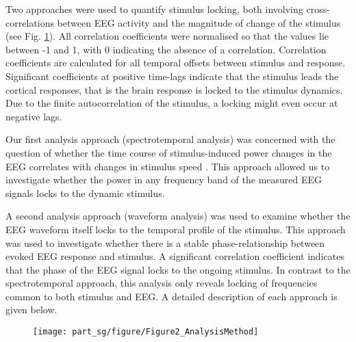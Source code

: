 Two approaches were used to quantify stimulus locking, both involving
cross-correlations between EEG activity and the magnitude of change of the
stimulus (see Fig. \ref{xcorrpower}). All correlation coefficients were
normalised so that the values lie between -1 and 1, with 0 indicating the
absence of a correlation. Correlation coefficients are calculated for all
temporal offsets between stimulus and response. Significant coefficients at
positive time-lags indicate that the stimulus leads the cortical responses,
that is the brain response is locked to the stimulus dynamics. Due to the
finite autocorrelation of the stimulus, a locking might even occur at
negative lags. 



Our first analysis approach (spectrotemporal analysis) was concerned with
the question of whether the time course of stimulus-induced power changes
in the EEG correlates with changes in stimulus speed . This approach
allowed us to investigate whether the power in any frequency band of the
measured EEG signals locks to the dynamic stimulus. 

A second analysis approach (waveform analysis) was used to examine whether
the EEG waveform itself locks to the temporal profile of the stimulus. This
approach was used to investigate whether there is a stable
phase-relationship between evoked EEG response and stimulus. A significant
correlation coefficient indicates that the phase of the EEG signal locks to
the ongoing stimulus. In contrast to the spectrotemporal approach, this
analysis only reveals locking of frequencies common to both stimulus and
EEG. A detailed description of each approach is given below.

\begin{figure}[!htb] \centerline{
\texttt{[image: part\_sg/figure/Figure2\_AnalysisMethod]}}
\caption[Two Correlation Analysis Approaches.]{\protect} \label{xcorrpower}\end{figure} 



